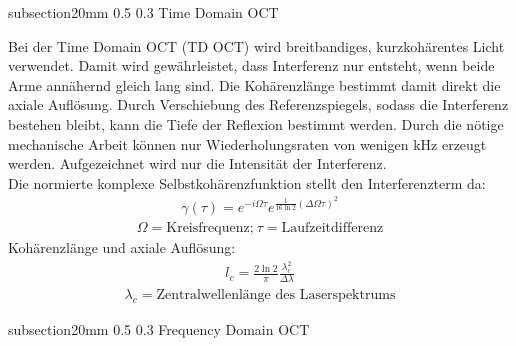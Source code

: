 \documentclass[german, %
parskip=full, %
bibliography=totoc, %
]{scrartcl}
\makeatletter
\renewcommand\subsection{\@startsection 
   {subsection}{2}{0mm}%
   {0.5\baselineskip}%
   {0.3\baselineskip}%
   {\bfseries\sffamily\large}%
   }
\makeatother
\begin{document}
\subsection{Time Domain OCT}

Bei der Time Domain OCT (TD OCT) wird breitbandiges, kurzkohärentes Licht verwendet. Damit wird gewährleistet, dass Interferenz nur entsteht, wenn beide Arme annähernd gleich lang sind. Die Kohärenzlänge bestimmt damit direkt die axiale Auflösung. Durch Verschiebung des Referenzspiegels, sodass die Interferenz bestehen bleibt, kann die Tiefe der Reflexion bestimmt werden. Durch die nötige mechanische Arbeit können nur Wiederholungsraten von wenigen kHz erzeugt werden. Aufgezeichnet wird nur die Intensität der Interferenz.\\
Die normierte komplexe Selbstkohärenzfunktion stellt den Interferenzterm da: 
\begin{align}
\gamma ( \tau ) = e^{-i \Omega \tau} e^{\frac{1}{16 \ln 2} ( \Delta \Omega \tau )^2} 
\end{align}
\begin{align*}
\Omega = \text{Kreisfrequenz;} \ \tau = \text{Laufzeitdifferenz}
\end{align*}
Kohärenzlänge und axiale Auflösung: 
\begin{align}
l_c = \frac{2 \ln 2}{\pi} \frac{\lambda_c^2}{\Delta \lambda} 
\end{align}
\begin{align*}
\lambda_c = \text{Zentralwellenlänge des Laserspektrums}
\end{align*}

\subsection{Frequency Domain OCT}
\end{document}
